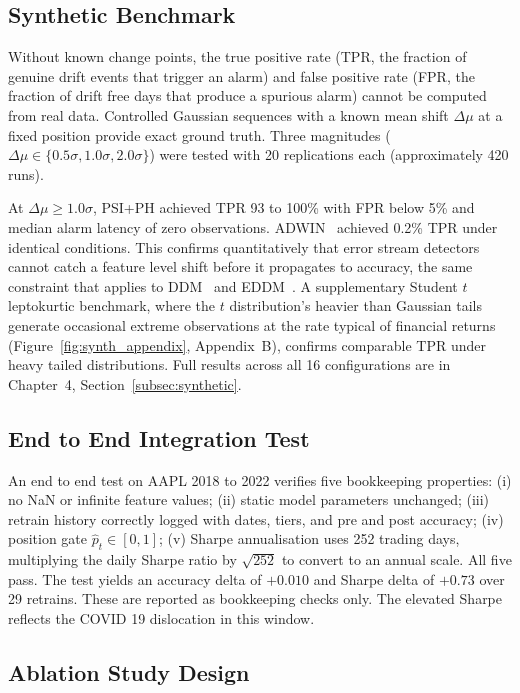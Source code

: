 \subsection{Synthetic Benchmark}
\label{subsec:synth_validation}

Without known change points, the true positive rate (TPR, the fraction of genuine drift events that trigger an alarm) and false positive rate (FPR, the fraction of drift free days that produce a spurious alarm) cannot be computed from real data. Controlled Gaussian sequences with a known mean shift $\Delta\mu$ at a fixed position provide exact ground truth. Three magnitudes ($\Delta\mu \in \{0.5\sigma, 1.0\sigma, 2.0\sigma\}$) were tested with 20 replications each (approximately 420 runs).

At $\Delta\mu \geq 1.0\sigma$, PSI+PH achieved TPR 93 to 100\% with FPR below 5\% and median alarm latency of zero observations. ADWIN~\cite{bifet2007adwin} achieved 0.2\% TPR under identical conditions. This confirms quantitatively that error stream detectors cannot catch a feature level shift before it propagates to accuracy, the same constraint that applies to DDM~\cite{gama2004ddm} and EDDM~\cite{baenagarcia2006eddm}. A supplementary Student $t$ leptokurtic benchmark, where the $t$ distribution's heavier than Gaussian tails generate occasional extreme observations at the rate typical of financial returns (Figure~\ref{fig:synth_appendix}, Appendix~B), confirms comparable TPR under heavy tailed distributions. Full results across all 16 configurations are in Chapter~4, Section~\ref{subsec:synthetic}.

\subsection{End to End Integration Test}
\label{subsec:e2e}

An end to end test on AAPL 2018 to 2022 verifies five bookkeeping properties: (i) no NaN or infinite feature values; (ii) static model parameters unchanged; (iii) retrain history correctly logged with dates, tiers, and pre and post accuracy; (iv) position gate $\hat{p}_t \in [0,1]$; (v) Sharpe annualisation uses 252 trading days, multiplying the daily Sharpe ratio by $\sqrt{252}$ to convert to an annual scale. All five pass. The test yields an accuracy delta of $+0.010$ and Sharpe delta of $+0.73$ over 29 retrains. These are reported as bookkeeping checks only. The elevated Sharpe reflects the COVID 19 dislocation in this window.

\subsection{Ablation Study Design}
\label{subsec:ablation_design}

